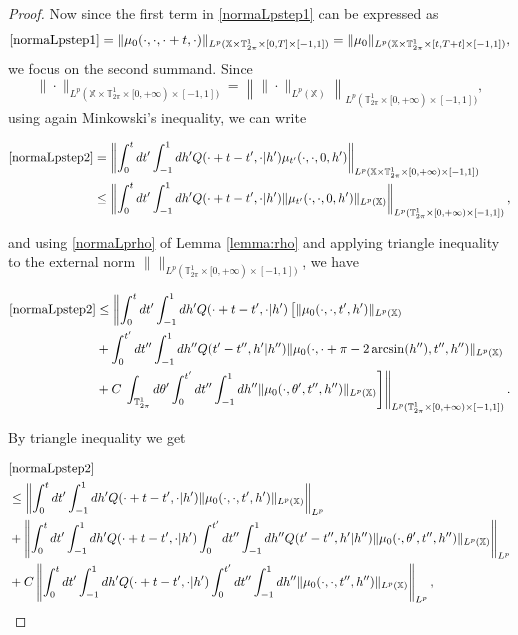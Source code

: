 \documentclass[10pt,a4paper]{amsart}
\begin{document}
\begin{proof}
Now since the first term in \eqref{normaLpstep1} can be expressed as
\[
\eqref{normaLpstep1}=\|\mu_0(\cdot,\cdot,\cdot+t,\cdot)\|_{L^p(\mathbb{X}\times\mathbb{T}^1_{2\pi}\times[0,T]\times[-1,1])}=\|\mu_0\|_{L^p(\mathbb{X}\times\mathbb{T}^1_{2\pi}\times[t,T+t]\times[-1,1])},
\]
we focus on the second summand. Since
\[
\|\cdot\|_{L^p(\mathbb{X}\times\mathbb{T}^1_{2\pi}\times[0,+\infty)\times[-1,1])}=\left\|\|\cdot\|_{L^p(\mathbb{X})}\right\|_{L^p(\mathbb{T}^1_{2\pi}\times[0,+\infty)\times[-1,1])},
\]
using again Minkowski's inequality, we can write

\begin{align*}
\eqref{normaLpstep2}&=\left\|\int_0^tdt'\int_{-1}^1dh'Q(\cdot+t-t',\cdot|h')\mu_{t'}(\cdot,\cdot,0,h')\right\|_{L^p(\mathbb{X}\times\mathbb{T}^1_{2\pi}\times[0,+\infty)\times[-1,1])}
\\
&\leq\left\|\int_0^tdt'\int_{-1}^1dh'Q(\cdot+t-t',\cdot|h')\|\mu_{t'}(\cdot,\cdot,0,h')\|_{L^p(\mathbb{X})}\right\|_{L^p(\mathbb{T}^1_{2\pi}\times[0,+\infty)\times[-1,1])},
\end{align*}

and using \eqref{normaLprho} of Lemma \ref{lemma:rho} and applying triangle inequality to the external norm $\|\|_{L^p(\mathbb{T}^1_{2\pi}\times[0,+\infty)\times[-1,1])}$, we have

\begin{align*}
\eqref{normaLpstep2}&\leq\left\|\int_0^tdt'\int_{-1}^1dh'Q(\cdot+t-t',\cdot|h')\left[\|\mu_0(\cdot,\cdot,t',h')\|_{L^p(\mathbb{X})}\right.\right.
\\
&+\int_0^{t'}dt''\int_{-1}^1dh''Q(t'-t'',h'|h'')\|\mu_0(\cdot,\cdot+\pi-2\arcsin(h''),t'',h'')\|_{L^p(\mathbb{X})}
\\
&+C\left.\left.\int_{\mathbb{T}^1_{2\pi}}d\theta'\int_0^{t'}dt''\int_{-1}^1dh''\|\mu_0(\cdot,\theta',t'',h'')\|_{L^p(\mathbb{X})}\right]\right\|_{L^p(\mathbb{T}^1_{2\pi}\times[0,+\infty)\times[-1,1])}.
\end{align*}

By triangle inequality we get

{\footnotesize\begin{align}
\nonumber&\eqref{normaLpstep2}
\\
\label{normaLpstep3}&\leq\left\|\int_0^tdt'\int_{-1}^1dh'Q(\cdot+t-t',\cdot|h')\|\mu_0(\cdot,\cdot,t',h')\|_{L^p(\mathbb{X})}\right\|_{L^p}
\\
\label{normaLpstep5}&+\left\|\int_0^tdt'\int_{-1}^1dh'Q(\cdot+t-t',\cdot|h')\int_0^{t'}dt''\int_{-1}^1dh'' Q(t'-t'',h'|h'')\|\mu_0(\cdot,\theta',t'',h'')\|_{L^p(\mathbb{X})}\right\|_{L^p}
\\
\label{normaLpstep4}&+C\left\|\int_0^tdt'\int_{-1}^1dh'Q(\cdot+t-t',\cdot|h')\int_0^{t'}dt''\int_{-1}^1dh''\|\mu_0(\cdot,\cdot,t'',h'')\|_{L^p(\mathbb{X})}\right\|_{L^p},
\end{align}}


\end{proof}
\end{document}
